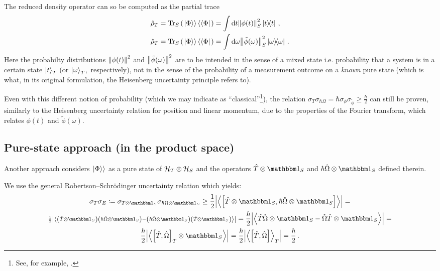 The reduced density operator can so be computed
as the partial trace
\begin{align}
  \label{eq:ptrace_density_matrix_t}
  \hat{\rho}_T = \Tr_S\qty(\left.\left| \Phi \right\rangle\right\rangle\left\langle\left\langle \Phi \right|\right.) &= \int \dd t \norm{\phi(t)}^2_S \ketbra{t}{t}
    \, \text{,}
  \\
  \label{eq:ptrace_density_matrix_omega}
  \hat{\rho}_T = \Tr_S\qty(\left.\left| \Phi \right\rangle\right\rangle\left\langle\left\langle \Phi \right|\right.) &= \int \dd \omega \norm{\tilde{\phi}(\omega)}^2_S \ketbra{\omega}{\omega}
    \,\text{.} 
\end{align}
Here the probabilty distributions $\norm{\phi(t)}^2$ and $\norm{\tilde{\phi}(\omega)}^2$
are to be intended in the sense of a mixed state
i.e. probability that a system is in a certain state $\ket{t}_T$
(or $\ket{\omega}_T$,~respectively),
not in the sense of the probability of a measurement outcome on a \emph{known} pure state
(which is what, in its original formulation, the Heisenberg uncertainty principle 
refers to).

Even with this different
notion of probability (which we may indicate as ``classical''\footnote{
  See, for example, \cite[eq.~2.20 and following discussion]{Schlosshauer_Decoherence_book}.
}),
the relation $\sigma_T\sigma_{\hbar\Omega} = \hbar \sigma_{\phi} \sigma_{\tilde{\phi}} \geq \frac{\hbar}{2}$
can still be proven,
similarly to 
the Heisenberg uncertainty
relation for position and linear momentum,
due to the properties of the Fourier transform,
which relates $\phi(t)$ and $\tilde{\phi}(\omega)$.

\subsection{Pure-state approach (in the product space)}\label{sec:pure-state-approach}

Another approach considers $\left.\left| \Phi \right\rangle\right\rangle$ as a pure state of $\mathcal{H}_T \otimes \mathcal{H}_S$
and the operators $\op{T} \ox \idop_{S}$ and $\hbar\op{\Omega} \ox \idop_{S}$
defined therein.


We use the general Robertson--Schr\"{o}dinger uncertainty relation which yields:
\begin{multline}
  \sigma_T \sigma_E \eqbydef
  \sigma_{T \ox \idop_S} \sigma_{\hbar\Omega \ox \idop_S} \geq
  \frac{1}{2} \abs{\expval{\comm
    {\op{T}\ox\idop_S} {\hbar\op{\Omega}\ox\idop_S}
  }} =
  \\
  {\scriptstyle
    \frac{1}{2} \abs{\expval{
      \qty(\op{T}\ox\idop_S) \qty(\hbar\op{\Omega}\ox\idop_S) -
      \qty(\hbar\op{\Omega}\ox\idop_S) \qty(\op{T}\ox\idop_S)
    }}
  } =
  \frac{\hbar}{2} \abs{\expval{
    \op{T}\op{\Omega}\ox\idop_S - \op{\Omega}\op{T}\ox\idop_S
  }} = \\
  \frac{\hbar}{2} \abs{\expval{
    \comm{\op{T}}{\op{\Omega}}_T \ox \idop_S
  }} =
  \frac{\hbar}{2} \abs{\expval{\comm
    {\op{T}}{\op{\Omega}}
  }_T} =
  \frac{\hbar}{2}
  \,\text{.}
\end{multline}


